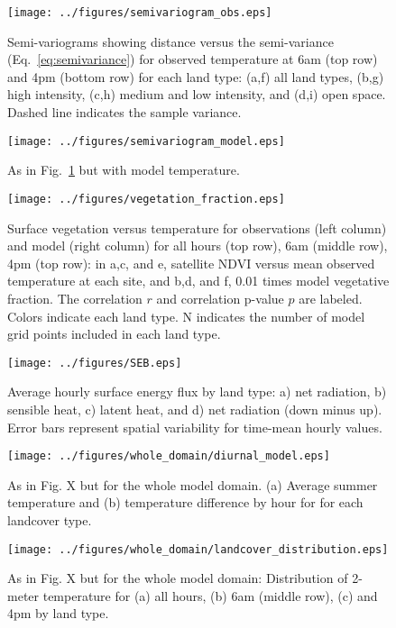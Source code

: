 \documentclass[draft,linenumbers]{agujournal}
\begin{document}
\begin{figure}[h]
\centering
\texttt{[image: ../figures/semivariogram\_obs.eps]}
\caption{Semi-variograms showing distance versus the semi-variance (Eq.~\ref{eq:semivariance}) for observed temperature at 6am (top row) and 4pm (bottom row) for each land type: (a,f) all land types, (b,g) high intensity, (c,h) medium and low intensity, and (d,i) open space. Dashed line indicates the sample variance. 
}\label{fig:semiv_obs}

\end{figure}

\begin{figure}[h]
\centering
\texttt{[image: ../figures/semivariogram\_model.eps]}
\caption{As in Fig.~\ref{fig:semiv_obs} but with model temperature.}
\label{fig:semiv_model}
\end{figure}

\begin{figure}[h]
\centering
\texttt{[image: ../figures/vegetation\_fraction.eps]}
\caption{Surface vegetation versus temperature for observations (left column) and model (right column) for all hours (top row), 6am (middle row), 4pm (top row): in a,c, and e, satellite NDVI versus mean observed temperature at each site, and b,d, and f, 0.01 times model vegetative fraction. The correlation $r$ and correlation p-value $p$ are labeled. Colors indicate each land type. N indicates the number of model grid points included in each land type.}
\label{fig:veg}
\end{figure}

\begin{figure}[h]
\centering
\texttt{[image: ../figures/SEB.eps]}
\caption{Average hourly surface energy flux by land type: a) net radiation, b) sensible heat, c) latent heat, and d) net radiation (down minus up). Error bars represent spatial variability for time-mean hourly values.}
\label{fig:seb}
\end{figure}

\begin{figure}[h]
\centering
\texttt{[image: ../figures/whole\_domain/diurnal\_model.eps]}
\caption{As in Fig. X but for the whole model domain. (a) Average summer temperature and (b) temperature difference by hour for for each landcover type.}%
\label{fig:diurnal_wd}
\end{figure}

\begin{figure}[h]
\centering
\texttt{[image: ../figures/whole\_domain/landcover\_distribution.eps]}
\caption{As in Fig. X but for the whole model domain: Distribution of 2-meter temperature for (a) all hours, (b) 6am (middle row), (c) and 4pm by land type. }
\label{fig:hist_wd}
\end{figure}
\end{document}
